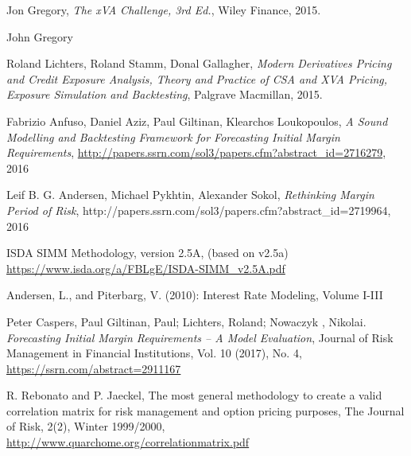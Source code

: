 \begin{thebibliography}{*}
 Jon Gregory, {\em The xVA Challenge, 3rd Ed.}, Wiley Finance, 2015.

 John Gregory

 Roland Lichters, Roland Stamm, Donal Gallagher, {\em Modern Derivatives Pricing and Credit Exposure
    Analysis, Theory and Practice of CSA and XVA Pricing, Exposure Simulation and Backtesting}, Palgrave Macmillan,
  2015.

 Fabrizio Anfuso, Daniel Aziz, Paul Giltinan, Klearchos Loukopoulos, {\em A Sound Modelling and
    Backtesting Framework for Forecasting Initial Margin Requirements},
  \url{http://papers.ssrn.com/sol3/papers.cfm?abstract_id=2716279}, 2016

 Leif B. G. Andersen, Michael Pykhtin, Alexander Sokol, {\em Rethinking Margin Period of Risk},
  http://papers.ssrn.com/sol3/papers.cfm?abstract\_id=2719964, 2016

 ISDA SIMM Methodology, version 2.5A, (based on v2.5a) \\
  \url{https://www.isda.org/a/FBLgE/ISDA-SIMM\_v2.5A.pdf}




 Andersen, L., and Piterbarg, V. (2010): Interest Rate Modeling, Volume I-III
  
 Peter Caspers, Paul Giltinan, Paul; Lichters, Roland; Nowaczyk , Nikolai. {\em Forecasting Initial Margin Requirements – A Model Evaluation}, Journal of Risk Management in Financial Institutions, Vol. 10 (2017), No. 4, \url{https://ssrn.com/abstract=2911167}

 R. Rebonato and P. Jaeckel, The most general methodology to create a valid correlation matrix for
  risk management and option pricing purposes, The Journal of Risk, 2(2), Winter 1999/2000,
  \url{http://www.quarchome.org/correlationmatrix.pdf}


\end{thebibliography}
